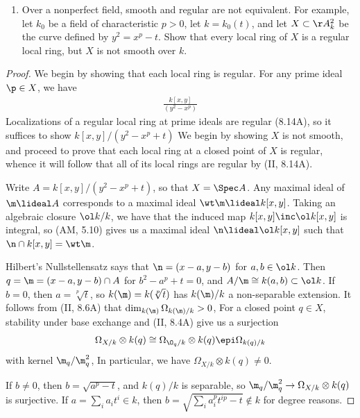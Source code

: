 \documentclass[12pt]{amsart}
\begin{document}
\begin{enumerate}
  \item[10.1] {
      Over a nonperfect field, smooth and regular are not equivalent.
      For example, let $k_0$ be a field of characteristic $p>0$, let $k=k_0(t)$, and let $X\subset \AA_k^2$ be the curve defined by $y^2 = x^p-t$.
      Show that every local ring of $X$ is a regular local ring, but $X$ is not smooth over $k$.
    }
\end{enumerate}

\begin{proof}
  We begin by showing that each local ring is regular.
  For any prime ideal $\p\in X$, we have
  \begin{align*}
    \frac{k[x,y]}{(y^2-x^p)}
  \end{align*}
  Localizations of a regular local ring at prime ideals are regular (8.14A), so it suffices to show $k[x,y]/(y^2 - x^p +t)$
  We begin by showing $X$ is not smooth, and proceed to prove that each local ring at a closed point of $X$ is regular, whence it will follow that all of its local rings are regular by (II, 8.14A).

  Write $A=k[x,y]/(y^2-x^p+t)$, so that $X=\Spec A$.
  Any maximal ideal of $\m\lideal A$ corresponds to a maximal ideal $\wt\m\lideal k[x,y]$.
  Taking an algebraic closure $\ol k/k$, we have that the induced map $k[x,y]\inc \ol k[x,y]$ is integral, so (AM, 5.10) gives us a maximal ideal $\n\lideal \ol k[x,y]$ such that $\n\cap k[x,y] = \wt\m$.

  Hilbert's Nullstellensatz says that $\n=(x-a,y-b)$ for $a,b\in \ol k$.
  Then $q=\m = (x-a,y-b)\cap A$ for $b^2-a^p+t=0$, and $A/\m\cong k(a,b)\subset\ol k$.
  If $b=0$, then $a=\sqrt[p]{t}$, so $k(\m)=k(\sqrt[p]{t})$ has $k(\m)/k$ a non-separable extension.
  It follows from (II, 8.6A) that $\dim_{k(\m)}\Omega_{k(\m)/k}>0$,
  For a closed point $q\in X$, stability under base exchange and (II, 8.4A) give us a surjection
  \begin{align*}
    \Omega_{X/k}\otimes k(q)\cong \Omega_{\O_q/k}\otimes k(q)\epi \Omega_{k(q)/k}
  \end{align*}
  with kernel $\m_q/\m_q^2$,
  In particular, we have $\Omega_{X/k}\otimes k(q)\neq 0$.

  If $b\neq 0$, then $b=\sqrt{a^p-t}$, and $k(q)/k$ is separable, so $\m_q/\m_q^2\to \Omega_{X/k}\otimes k(q)$ is surjective.
  If $a=\sum_i a_it^i\in k$, then $b=\sqrt{\sum_i a_i^pt^{ip} - t}\notin k$ for degree reasons.
\end{proof}
\end{document}
